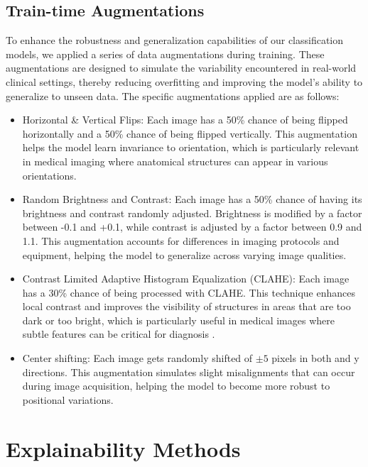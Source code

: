 \subsection{Train-time Augmentations}
To enhance the robustness and generalization capabilities of our classification models, we applied a series of data augmentations during training. These augmentations are designed to simulate the variability encountered in real-world clinical settings, thereby reducing overfitting and improving the model's ability to generalize to unseen data. The specific augmentations applied are as follows:
\begin{itemize}
    \item Horizontal \& Vertical Flips: Each image has a 50\% chance of being flipped horizontally and a 50\% chance of being flipped vertically. This augmentation helps the model learn invariance to orientation, which is particularly relevant in medical imaging where anatomical structures can appear in various orientations.
    \item Random Brightness and Contrast: Each image has a 50\% chance of having its brightness and contrast randomly adjusted. Brightness is modified by a factor between -0.1 and +0.1, while contrast is adjusted by a factor between 0.9 and 1.1. This augmentation accounts for differences in imaging protocols and equipment, helping the model to generalize across varying image qualities.
    \item Contrast Limited Adaptive Histogram Equalization (CLAHE): Each image has a 30\% chance of being processed with CLAHE. This technique enhances local contrast and improves the visibility of structures in areas that are too dark or too bright, which is particularly useful in medical images where subtle features can be critical for diagnosis \cite{mishra2021clahe}.
    \item Center shifting: Each image gets randomly shifted of $\pm 5$ pixels in both and y directions. This augmentation simulates slight misalignments that can occur during image acquisition, helping the model to become more robust to positional variations.
\end{itemize}

\section{Explainability Methods}
\label{sec:xai_methods}

